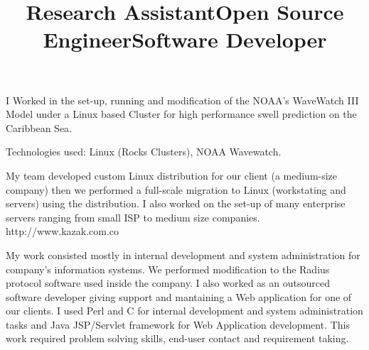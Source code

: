\begin{resume}
\title{\textbf{Research Assistant}}
\begin{position}
I Worked in the set-up, running and modification of the NOAA's WaveWatch III Model under a Linux based Cluster
for high performance swell prediction on the Caribbean Sea.

Technologies used:
Linux (Rocks Clusters), NOAA Wavewatch.
\end{position}
\newline
\newline
\newline
\newline
\newline
\newline
\newline


\title{\textbf{Open Source Engineer}}
\begin{position}
My team developed custom  Linux distribution for our client (a medium-size company) then we performed a full-scale migration to Linux
(workstating and servers) using the distribution. I also worked on  the set-up of many enterprise
servers ranging from small ISP to medium size companies. 
http://www.kazak.com.co
\end{position}


\title{\textbf{Software Developer}}
\begin{position}
My work consisted mostly  in internal development and system
 administration   for  company's information systems.
We performed modification to the Radius protocol software used inside the company.
I also worked as an outsourced software developer giving support and
 mantaining  a Web application for one of our clients.  I used Perl and C for internal
development and  system administration tasks and Java JSP/Servlet
framework for Web Application development. This work required problem
 solving skills, end-user contact and requirement taking.
\end{position}


\end{resume}
